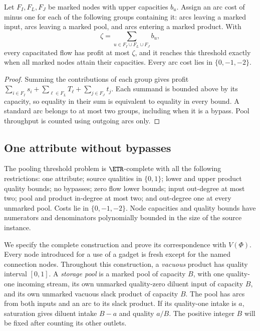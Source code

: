 \begin{lemma}\label{s2:saturation}
Let $F_I,F_L,F_J$ be marked nodes with upper capacities $b_u$.
Assign an arc cost of minus one for each of the following groups
containing it: arcs leaving a marked input, arcs leaving a marked pool,
and arcs entering a marked product. With
\[
 \zeta=\sum_{u\in F_I\cup F_L\cup F_J}b_u,
\]
every capacitated flow has profit at most $\zeta$, and it reaches this
threshold exactly when all marked nodes attain their capacities.
Every arc cost lies in $\{0,-1,-2\}$.
\end{lemma}
\begin{proof}
Summing the contributions of each group gives profit
$\sum_{i\in F_I}s_i+\sum_{\ell\in F_L}T_\ell+
\sum_{j\in F_J}t_j$. Each summand is bounded above by its capacity,
so equality in their sum is equivalent to equality in every bound.
A standard arc belongs to at most two groups, including when it is
a bypass. Pool throughput is counted using outgoing arcs only.
\end{proof}

\subsection{One attribute without bypasses}\label{s2:many-pools}

\begin{theorem}\label{s2:etr-complete}
The pooling threshold problem is $\ETR$-complete with all the following
restrictions: one attribute; source qualities in $\{0,1\}$; lower and upper
product quality bounds; no bypasses; zero flow lower bounds; input
out-degree at most two; pool and product in-degree at most two; and
out-degree one at every unmarked pool. Costs lie in $\{0,-1,-2\}$.
Node capacities and quality bounds have numerators and denominators
polynomially bounded in the size of the source instance.
\end{theorem}

We specify the complete construction and prove its correspondence with
$V(\Phi)$. Every node introduced for a use of a gadget is fresh except
for the named connection nodes. Throughout this construction, a
\emph{vacuous} product has quality interval $[0,1]$. A \emph{storage pool}
is a marked pool of capacity $B$, with one quality-one incoming stream,
its own unmarked quality-zero diluent input of capacity $B$, and its own
unmarked vacuous slack product of capacity $B$. The pool has arcs from
both inputs and an arc to its slack product. If its quality-one intake
is $a$, saturation gives diluent intake $B-a$ and quality $a/B$.
The positive integer $B$ will be fixed after counting its other outlets.

